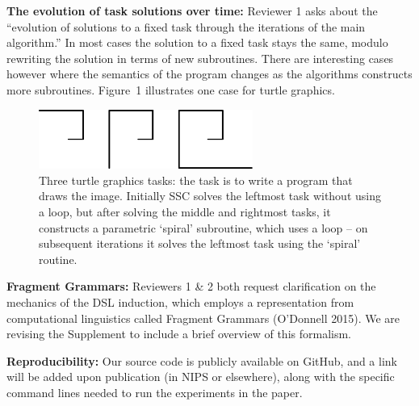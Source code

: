 \documentclass{article}
\begin{document}

\textbf{The evolution of task solutions over time:} %
Reviewer 1 asks about the ``evolution of solutions to a fixed task through the iterations of the main algorithm.''
In most cases the solution to a fixed task
stays the same,
modulo rewriting the solution in terms of new subroutines.
There are interesting cases however where the
semantics of the program changes as the algorithms constructs more subroutines. Figure~1
illustrates one case for turtle graphics.
\begin{figure}
  \centering
  \includegraphics[width=7cm]{figures/rebutal/spirals.eps}
  \caption{Three turtle graphics tasks: the task is to write a program that draws the image. Initially SSC solves the leftmost task without using a loop, but after solving the middle and rightmost tasks,
  it constructs a parametric `spiral' subroutine, which uses a loop -- on subsequent iterations it solves the leftmost task using the `spiral' routine.}
\end{figure}

\textbf{Fragment Grammars:} Reviewers 1 \& 2 both request clarification on the mechanics of the DSL induction,
which employs a representation from computational linguistics called Fragment Grammars (O'Donnell 2015).
We are revising the Supplement to include a brief overview of this formalism.

\textbf{Reproducibility:} %
Our source code is publicly available on GitHub,
and a link will be added upon publication (in NIPS or elsewhere),
along with the specific command lines  needed to run
the experiments in the paper.
\end{document}
